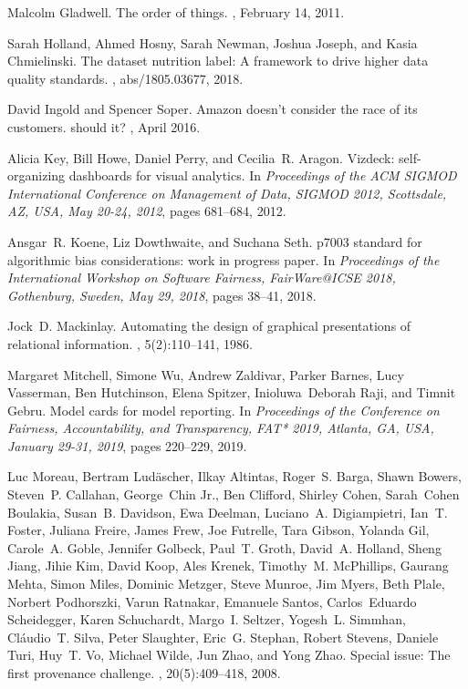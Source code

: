 Malcolm Gladwell.
\newblock The order of things.
, February 14, 2011.

Sarah Holland, Ahmed Hosny, Sarah Newman, Joshua Joseph, and Kasia Chmielinski.
\newblock The dataset nutrition label: {A} framework to drive higher data
  quality standards.
, abs/1805.03677, 2018.

David Ingold and Spencer Soper.
\newblock Amazon doesn’t consider the race of its customers. should it?
, April 2016.

Alicia Key, Bill Howe, Daniel Perry, and Cecilia~R. Aragon.
\newblock Vizdeck: self-organizing dashboards for visual analytics.
\newblock In {\em Proceedings of the {ACM} {SIGMOD} International Conference on
  Management of Data, {SIGMOD} 2012, Scottsdale, AZ, USA, May 20-24, 2012},
  pages 681--684, 2012.

Ansgar~R. Koene, Liz Dowthwaite, and Suchana Seth.
 p7003{\texttrademark} standard for algorithmic bias
  considerations: work in progress paper.
\newblock In {\em Proceedings of the International Workshop on Software
  Fairness, FairWare@ICSE 2018, Gothenburg, Sweden, May 29, 2018}, pages
  38--41, 2018.

Jock~D. Mackinlay.
\newblock Automating the design of graphical presentations of relational
  information.
, 5(2):110--141, 1986.

Margaret Mitchell, Simone Wu, Andrew Zaldivar, Parker Barnes, Lucy Vasserman,
  Ben Hutchinson, Elena Spitzer, Inioluwa~Deborah Raji, and Timnit Gebru.
\newblock Model cards for model reporting.
\newblock In {\em Proceedings of the Conference on Fairness, Accountability,
  and Transparency, FAT* 2019, Atlanta, GA, USA, January 29-31, 2019}, pages
  220--229, 2019.

Luc Moreau, Bertram Lud{\"{a}}scher, Ilkay Altintas, Roger~S. Barga, Shawn
  Bowers, Steven~P. Callahan, George~Chin Jr., Ben Clifford, Shirley Cohen,
  Sarah~Cohen Boulakia, Susan~B. Davidson, Ewa Deelman, Luciano~A.
  Digiampietri, Ian~T. Foster, Juliana Freire, James Frew, Joe Futrelle, Tara
  Gibson, Yolanda Gil, Carole~A. Goble, Jennifer Golbeck, Paul~T. Groth,
  David~A. Holland, Sheng Jiang, Jihie Kim, David Koop, Ales Krenek, Timothy~M.
  McPhillips, Gaurang Mehta, Simon Miles, Dominic Metzger, Steve Munroe, Jim
  Myers, Beth Plale, Norbert Podhorszki, Varun Ratnakar, Emanuele Santos,
  Carlos~Eduardo Scheidegger, Karen Schuchardt, Margo~I. Seltzer, Yogesh~L.
  Simmhan, Cl{\'{a}}udio~T. Silva, Peter Slaughter, Eric~G. Stephan, Robert
  Stevens, Daniele Turi, Huy~T. Vo, Michael Wilde, Jun Zhao, and Yong Zhao.
\newblock Special issue: The first provenance challenge.
,
  20(5):409--418, 2008.

